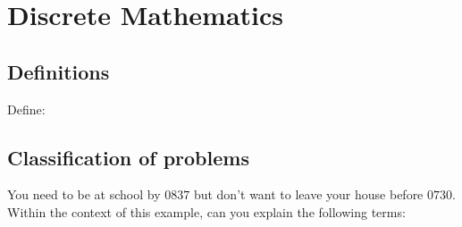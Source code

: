 \section{Discrete Mathematics}
\begin{questions}
	\subsection{Definitions}
	\question Define: 
	\subsection{Classification of problems}
	\question You need to be at school by $0837$ but don't want to leave your house before $0730$. Within the context of this example, can you explain the following terms: 
\end{questions}
